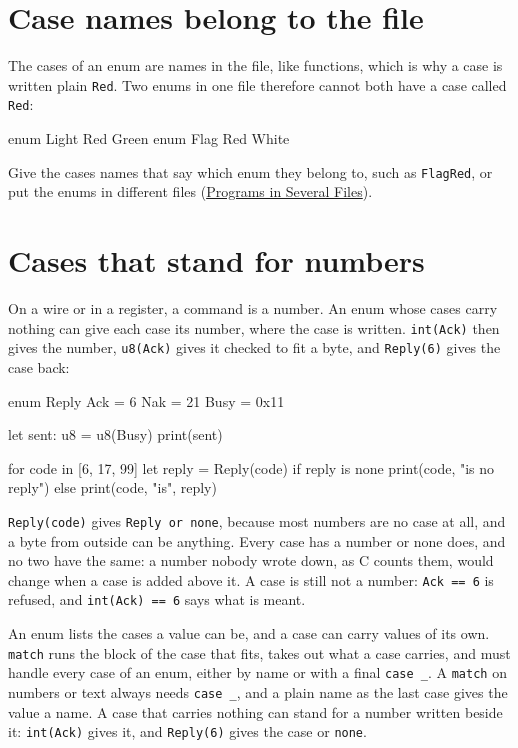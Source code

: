 \section{Case names belong to the file}

The cases of an enum are names in the file, like functions, which is
why a case is written plain \verb|Red|. Two enums in one file
therefore cannot both have a case called \verb|Red|:

\begin{zeno}[fails=yes]
enum Light {
    Red
    Green
}
enum Flag {
    Red
    White
}
\end{zeno}

Give the cases names that say which enum they belong to, such as
\verb|FlagRed|, or put the enums in different files
(\hyperref[ch-modules]{Programs in Several Files}).

\section{Cases that stand for numbers}

On a wire or in a register, a command is a number. An enum whose
cases carry nothing can give each case its number, where the case is
written. \verb|int(Ack)| then gives the number, \verb|u8(Ack)| gives
it checked to fit a byte, and \verb|Reply(6)| gives the case back:

\begin{zeno}[file=reply.zeno]
enum Reply {
    Ack = 6
    Nak = 21
    Busy = 0x11
}

let sent: u8 = u8(Busy)
print(sent)

for code in [6, 17, 99] {
    let reply = Reply(code)
    if reply is none {
        print(code, "is no reply")
    } else {
        print(code, "is", reply)
    }
}
\end{zeno}

\verb|Reply(code)| gives \verb|Reply or none|, because most numbers
are no case at all, and a byte from outside can be anything. Every
case has a number or none does, and no two have the same: a number
nobody wrote down, as C counts them, would change when a case is
added above it. A case is still not a number: \verb|Ack == 6| is
refused, and \verb|int(Ack) == 6| says what is meant.

\begin{summary}
An enum lists the cases a value can be, and a case can carry values
of its own. \verb|match| runs the block of the case that fits, takes
out what a case carries, and must handle every case of an enum, either
by name or with a final \verb|case _|. A \verb|match| on numbers or
text always needs \verb|case _|, and a plain name as the last case
gives the value a name. A case that carries nothing can stand for a
number written beside it: \verb|int(Ack)| gives it, and
\verb|Reply(6)| gives the case or \verb|none|.
\end{summary}

